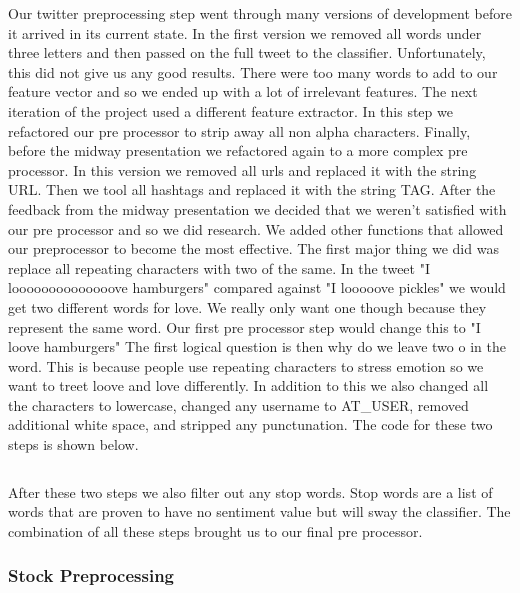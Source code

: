 \documentclass{acm_proc_article-sp}
\begin{document}
Our twitter preprocessing step went through many versions of development before
it arrived in its current state. In the first version we removed all words
under three letters and then passed on the full tweet to the classifier.
Unfortunately, this did not give us any good results. There were too many words
to add to our feature vector and so we ended up with a lot of irrelevant
features. The next iteration of the project used a different feature extractor.
In this step we refactored our pre processor to strip away all non alpha
characters. Finally, before the midway presentation we refactored again to a
more complex pre processor. In this version we removed all urls and replaced it
with the string URL. Then we tool all hashtags and replaced it with the string
TAG. After the feedback from the midway presentation we decided that we weren't
satisfied with our pre processor and so we did research.  We added other
functions that allowed our preprocessor to become the most effective. The first
major thing we did was replace all repeating characters with two of the same.
In the tweet "I loooooooooooooove hamburgers" compared against "I looooove
pickles" we would get two different words for love. We really only want one
though because they represent the same word. Our first pre processor step would
change this to "I loove hamburgers" The first logical question is then why do
we leave two o in the word. This is because people use repeating characters to
stress emotion so we want to treet loove and love differently. In addition to
this we also changed all the characters to lowercase, changed any username to
AT\_USER, removed additional white space, and stripped any punctunation. The
code for these two steps is shown below.

\inputminted{python}{examples/preTweet.py}

After these two steps we also filter out any stop words. Stop words are a list of words
that are proven to have no sentiment value but will sway the classifier. The combination
of all these steps brought us to our final pre processor.

\subsubsection{Stock Preprocessing}
 
\end{document}
